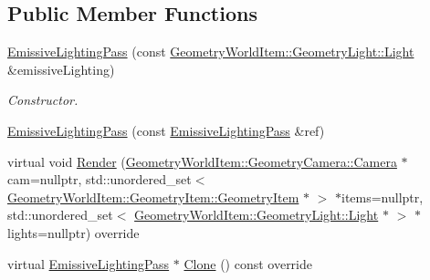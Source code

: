\subsection*{Public Member Functions}
\begin{DoxyCompactItemize}
\item 
\mbox{\label{class_geometry_engine_1_1_geometry_render_step_1_1_emissive_lighting_pass_a826e0eee0473e47302406b328bc73104}} 
\mbox{\hyperlink{class_geometry_engine_1_1_geometry_render_step_1_1_emissive_lighting_pass_a826e0eee0473e47302406b328bc73104}{Emissive\+Lighting\+Pass}} (const \mbox{\hyperlink{class_geometry_engine_1_1_geometry_world_item_1_1_geometry_light_1_1_light}{Geometry\+World\+Item\+::\+Geometry\+Light\+::\+Light}} \&emissive\+Lighting)
\begin{DoxyCompactList}\small\item\em Constructor. \end{DoxyCompactList}\item 
\mbox{\hyperlink{class_geometry_engine_1_1_geometry_render_step_1_1_emissive_lighting_pass_af05c874fca05ebac313f13bbccbbb4d3}{Emissive\+Lighting\+Pass}} (const \mbox{\hyperlink{class_geometry_engine_1_1_geometry_render_step_1_1_emissive_lighting_pass}{Emissive\+Lighting\+Pass}} \&ref)
\item 
virtual void \mbox{\hyperlink{class_geometry_engine_1_1_geometry_render_step_1_1_emissive_lighting_pass_adffe18f64968290aedda426bc4450414}{Render}} (\mbox{\hyperlink{class_geometry_engine_1_1_geometry_world_item_1_1_geometry_camera_1_1_camera}{Geometry\+World\+Item\+::\+Geometry\+Camera\+::\+Camera}} $\ast$cam=nullptr, std\+::unordered\+\_\+set$<$ \mbox{\hyperlink{class_geometry_engine_1_1_geometry_world_item_1_1_geometry_item_1_1_geometry_item}{Geometry\+World\+Item\+::\+Geometry\+Item\+::\+Geometry\+Item}} $\ast$ $>$ $\ast$items=nullptr, std\+::unordered\+\_\+set$<$ \mbox{\hyperlink{class_geometry_engine_1_1_geometry_world_item_1_1_geometry_light_1_1_light}{Geometry\+World\+Item\+::\+Geometry\+Light\+::\+Light}} $\ast$ $>$ $\ast$lights=nullptr) override
\item 
virtual \mbox{\hyperlink{class_geometry_engine_1_1_geometry_render_step_1_1_emissive_lighting_pass}{Emissive\+Lighting\+Pass}} $\ast$ \mbox{\hyperlink{class_geometry_engine_1_1_geometry_render_step_1_1_emissive_lighting_pass_a5a46d5e73fe672e09584a2e6e8bfa5e8}{Clone}} () const override
\end{DoxyCompactItemize}
